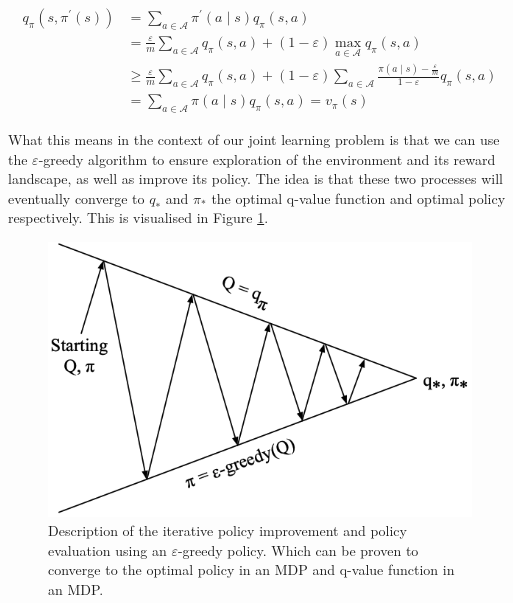 \documentclass{article}
\begin{document}
\begin{equation}
\begin{aligned} 
    q_\pi\left(s, \pi^{\prime}(s)\right) 
    &= \sum_{a \in \mathcal{A}} \pi^{\prime}(a \mid s) q_\pi(s, a) \\
    &= \frac{\varepsilon}{m} \sum_{a \in \mathcal{A}} q_\pi(s, a) + (1 - \varepsilon) \max_{a \in \mathcal{A}} q_\pi(s, a) \\
    &\geq \frac{\varepsilon}{m} \sum_{a \in \mathcal{A}} q_\pi(s, a) 
        + (1 - \varepsilon) \sum_{a \in \mathcal{A}} \frac{\pi(a \mid s) - \frac{\varepsilon}{m}}{1 - \varepsilon} q_\pi(s, a) \\
    &= \sum_{a \in \mathcal{A}} \pi(a \mid s) q_\pi(s, a) = v_\pi(s)
\end{aligned}	
\end{equation}

What this means in the context of our joint learning problem is that we can use the $\varepsilon$-greedy algorithm to ensure exploration of the environment and its reward landscape, as well as improve its policy. The idea is that these two processes will eventually converge to $q_*$ and $\pi_*$ the optimal q-value function and optimal policy respectively. This is visualised in Figure \ref{fig:eval_improvement}.

\begin{figure}
	\centering
	\includegraphics[scale=0.4]{images/eval_improve.png}
	\caption{ Description of the iterative policy improvement and policy evaluation using an $\varepsilon$-greedy policy.\citep{silver2015rl} Which can be proven to converge to the optimal policy in an MDP and q-value function in an MDP.}
	\label{fig:eval_improvement}
\end{figure}
\end{document}
